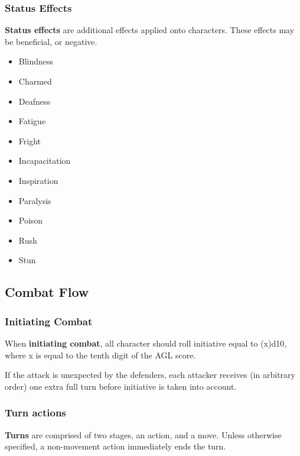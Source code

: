 \documentclass[12pt,]{article}
\providecommand{\tightlist}{%
  \setlength{\itemsep}{0pt}\setlength{\parskip}{0pt}}
\begin{document}
\subsubsection{Status Effects}\label{status-effects}

\textbf{Status effects} are additional effects applied onto characters.
These effects may be beneficial, or negative.

\begin{itemize}
\tightlist
\item
  Blindness
\item
  Charmed
\item
  Deafness
\item
  Fatigue
\item
  Fright
\item
  Incapacitation
\item
  Inspiration
\item
  Paralysis
\item
  Poison
\item
  Rush
\item
  Stun
\end{itemize}

\subsection{Combat Flow}\label{combat-flow}

\subsubsection{Initiating Combat}\label{initiating-combat}

When \textbf{initiating combat}, all character should roll initiative
equal to (x)d10, where x is equal to the tenth digit of the AGL score.

If the attack is unexpected by the defenders, each attacker receives (in
arbitrary order) one extra full turn before initiative is taken into
account.

\subsubsection{Turn actions}\label{turn-actions}

\textbf{Turns} are comprised of two stages, an action, and a move.
Unless otherwise specified, a non-movement action immediately ends the
turn.
\end{document}
